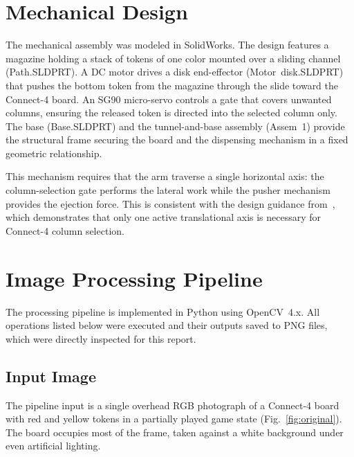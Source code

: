 \documentclass[conference]{IEEEtran}
\begin{document}
\section{Mechanical Design}
\label{sec:mech}

The mechanical assembly was modeled in SolidWorks. The design features a magazine
holding a stack of tokens of one color mounted over a sliding channel (Path.SLDPRT).
A DC motor drives a disk end-effector (Motor~disk.SLDPRT) that pushes the
bottom token from the magazine through the slide toward the Connect-4 board.
An SG90 micro-servo controls a gate that covers unwanted columns, ensuring the
released token is directed into the selected column only. The base
(Base.SLDPRT) and the tunnel-and-base assembly (Assem~1) provide the structural
frame securing the board and the dispensing mechanism in a fixed geometric
relationship.

This mechanism requires that the arm traverse a single horizontal axis: the
column-selection gate performs the lateral work while the pusher mechanism
provides the ejection force. This is consistent with the design guidance
from~\cite{Abarkan2024}, which demonstrates that only one active translational
axis is necessary for Connect-4 column selection.

\section{Image Processing Pipeline}
\label{sec:pipeline}

The processing pipeline is implemented in Python using OpenCV~4.x.
All operations listed below were executed and their outputs saved to
PNG files, which were directly inspected for this report.

\subsection{Input Image}

The pipeline input is a single overhead RGB photograph of a Connect-4 board
with red and yellow tokens in a partially played game state
(Fig.~\ref{fig:original}). The board occupies most of the frame, taken against
a white background under even artificial lighting.
\end{document}

